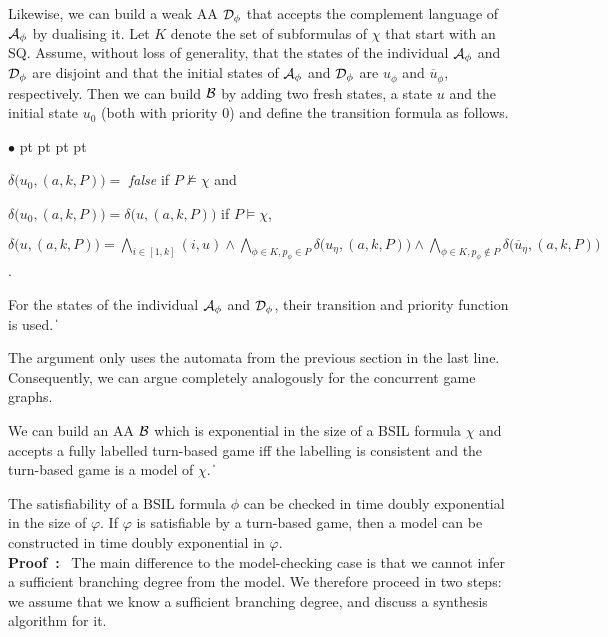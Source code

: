 \documentclass[11pt]{article}
\newcommand{\cala}{{\cal A}}
\newcommand{\calb}{{\cal B}}
\newcommand{\cald}{{\cal D}}
\newcommand{\pf}{\noindent\mbox{\bf Proof : }}
\def\qed{\ifmmode\|\else{\unskip\nobreak\hfil
\penalty50\hskip1em\null\nobreak\hfil$\blacksquare$
\parfillskip=0pt\finalhyphendemerits=0\endgraf}\fi}
\newenvironment{list1}{\begin{list}{$\bullet$}
{\topsep 0 pt \parsep 0 pt \partopsep 0 pt \itemsep 0 pt}}{\end{list}}
\newcounter{sequent1}
\newcounter{sequent2}
\newcounter{sequent3}
\newcounter{sequent4}
\begin{document}
Likewise, we can build a weak AA $\cald_\phi$ 
that accepts the complement language of $\cala_\phi$ 
by dualising it.  
Let $K$ denote the set of subformulas of $\chi$ that start with an SQ.
Assume, without loss of generality, 
that the states of the individual $\cala_\phi$ and $\cald_\phi$ 
are disjoint and 
that the initial states of $\cala_\phi$ and $\cald_\phi$ are $u_\phi$ 
and $\overline{u}_\phi$, respectively.
Then we can build $\calb$ by adding two fresh states, a state $u$ 
and the initial state $u_0$ (both with priority 0) and define 
the transition formula as follows. 
\begin{list1}
\item $\delta\big(u_0,(a,k,P)\big) =$ \emph{false} if $P\not\models \chi$ 
  and  
\item $\delta\big(u_0,(a,k,P)\big) = \delta\big(u,(a,k,P)\big)$ 
  if $P\models \chi$,
\item $\delta\big(u,(a,k,P)\big) = \bigwedge\limits_{i\in[1,k]}(i,u) 
  \wedge \bigwedge_{\phi\in K,p_\phi\in P} \delta\big(u_\eta,(a,k,P)\big) 
  \wedge \bigwedge_{\phi\in K,p_\phi\notin P} 
    \delta\big(\overline{u}_\eta,(a,k,P)\big)$.
\end{list1}
For the states of the individual $\cala_\phi$ and $\cald_\phi$, their transition and priority function is used.
\qed 

The argument only uses the automata from the previous section in the last line. Consequently, we can argue completely analogously for the concurrent game graphs.

{\lemma\label{lemma.sat.B.cgg}
We can build an AA $\calb$ 
which is exponential in the size of a BSIL formula $\chi$ 
and accepts a fully labelled turn-based game 
iff the labelling is consistent and the turn-based game 
is a model of $\chi$.
\qed
}

{\theorem\label{thm.sat}
The satisfiability of a BSIL formula $\phi$ can be checked in time doubly exponential in the size of $\varphi$.
If $\varphi$ is satisfiable by a turn-based game, then a model can be constructed in time doubly exponential in $\varphi$.
}
\\\pf
The main difference to the model-checking case is that we cannot infer a sufficient branching degree from the model.
We therefore proceed in two steps: we assume that we know a sufficient branching degree, and discuss a synthesis algorithm for it.
\end{document}
